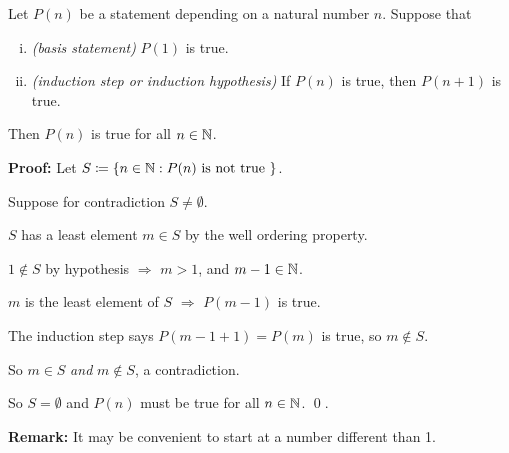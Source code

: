 \documentclass[10pt,aspectratio=149]{beamer}
\begin{document}
\begin{frame}
\begin{theorem}
Let $P(n)$ be a statement depending on a natural number $n$.
\pause
Suppose that
\begin{enumerate}[(i)]
\item \emph{(basis statement)} $P(1)$ is true.
\pause
\item \emph{(induction step or induction hypothesis)} If $P(n)$ is true, then $P(n+1)$ is true.
\end{enumerate}
\pause
Then $P(n)$ is true for all $n \in {\mathbb{N}}$.
\end{theorem}
\pause

\textbf{Proof:}
Let $S \coloneqq \{ n \in {\mathbb{N}} : P(n) \text{ is not true } \}$.

\medskip
\pause

Suppose for contradiction $S \not= \emptyset$.

\medskip
\pause

$S$ has a least element $m \in S$ by the well ordering property.

\medskip
\pause

$1 \notin S$ by hypothesis \quad $\Rightarrow$ \quad
$m > 1$, and $m-1 \in {\mathbb{N}}$.

\medskip
\pause

$m$ is the least element of $S$ \quad $\Rightarrow$ \quad $P(m-1)$ is true.

\medskip
\pause

The induction step says $P(m-1+1) = P(m)$ is true, so $m \notin S$.

\medskip
\pause

So $m \in S$ \emph{and} $m \notin S$, a contradiction.

\medskip
\pause

So $S = \emptyset$ and $P(n)$ must be true for all $n \in {\mathbb{N}}$.
\qed.

\medskip
\pause

\textbf{Remark:} It may be convenient to start at a number different than 1.
\end{frame}
\end{document}
